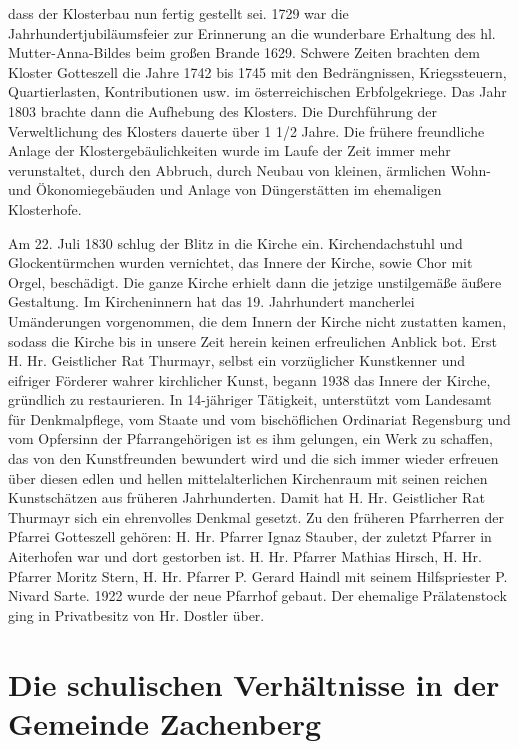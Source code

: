 \documentclass{book}
\begin{document}
dass der Klosterbau nun fertig gestellt sei. 1729 war die
Jahrhundertjubiläumsfeier zur Erinnerung an die wunderbare Erhaltung des
hl. Mutter-Anna-Bildes beim großen Brande 1629. Schwere Zeiten brachten
dem Kloster Gotteszell die Jahre 1742 bis 1745 mit den Bedrängnissen,
Kriegssteuern, Quartierlasten, Kontributionen usw. im österreichischen
Erbfolgekriege. Das Jahr 1803 brachte dann die Aufhebung des Klosters.
Die Durchführung der Verweltlichung des Klosters dauerte über 1 1/2
Jahre. Die frühere freundliche Anlage der Klostergebäulichkeiten wurde
im Laufe der Zeit immer mehr verunstaltet, durch den Abbruch, durch
Neubau von kleinen, ärmlichen Wohn- und Ökonomiegebäuden und Anlage von
Düngerstätten im ehemaligen Klosterhofe.

Am 22. Juli 1830 schlug der Blitz in die Kirche ein. Kirchendachstuhl
und Glockentürmchen wurden vernichtet, das Innere der Kirche, sowie Chor
mit Orgel, beschädigt. Die ganze Kirche erhielt dann die jetzige
unstilgemäße äußere Gestaltung. Im Kircheninnern hat das 19. Jahrhundert
mancherlei Umänderungen vorgenommen, die dem Innern der Kirche nicht
zustatten kamen, sodass die Kirche bis in unsere Zeit herein keinen
erfreulichen Anblick bot. Erst H. Hr. Geistlicher Rat Thurmayr, selbst
ein vorzüglicher Kunstkenner und eifriger Förderer wahrer kirchlicher
Kunst, begann 1938 das Innere der Kirche, gründlich zu restaurieren. In
14-jähriger Tätigkeit, unterstützt vom Landesamt für Denkmalpflege, vom
Staate und vom bischöflichen Ordinariat Regensburg und vom Opfersinn der
Pfarrangehörigen ist es ihm gelungen, ein Werk zu schaffen, das von den
Kunstfreunden bewundert wird und die sich immer wieder erfreuen über
diesen edlen und hellen mittelalterlichen Kirchenraum mit seinen reichen
Kunstschätzen aus früheren Jahrhunderten. Damit hat H. Hr. Geistlicher
Rat Thurmayr sich ein ehrenvolles Denkmal gesetzt. Zu den früheren
Pfarrherren der Pfarrei Gotteszell gehören: H. Hr. Pfarrer Ignaz
Stauber, der zuletzt Pfarrer in Aiterhofen war und dort gestorben ist.
H. Hr. Pfarrer Mathias Hirsch, H. Hr. Pfarrer Moritz Stern, H. Hr.
Pfarrer P. Gerard Haindl mit seinem Hilfspriester
P. Nivard Sarte. 1922 wurde der neue Pfarrhof gebaut. Der ehemalige
Prälatenstock ging in Privatbesitz von Hr. Dostler über.

\section{Die schulischen Verhältnisse in der Gemeinde Zachenberg}
\end{document}

